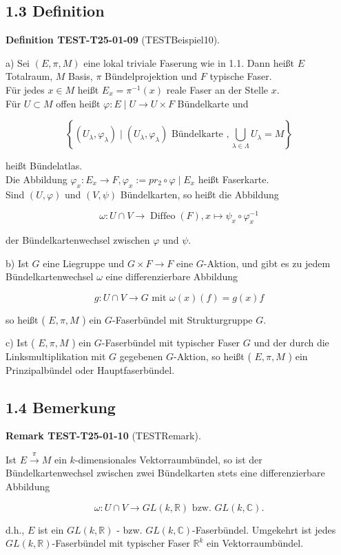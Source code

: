 \documentclass[10pt, letterpaper]{article}
\newcommand{\CustomHeading}[3]{%
  \par\medskip\noindent%
  \textbf{#1 #2} \textnormal{(#3)}.\enskip%
}
\newenvironment{DEF}[2]{\begin{unitbox}\CustomHeading{Definition}{#1}{#2}}{\end{unitbox}}
\newenvironment{REM}[2]{\begin{unitbox}\CustomHeading{Remark}{#1}{#2}}{\end{unitbox}}
\begin{document}
\subsection*{1.3 Definition}
\begin{DEF}{TEST-T25-01-09}{TESTBeispiel10}
a) Sei $(E, \pi, M)$ eine lokal triviale Faserung wie in 1.1. Dann heißt $E$ Totalraum, $M$ Basis, $\pi$ Bündelprojektion und $F$ typische Faser.\\
Für jedes $x \in M$ heißt $E_{x}=\pi^{-1}(x)$ reale Faser an der Stelle $x$.\\
Für $U \subset M$ offen heißt $\varphi: E \mid U \rightarrow U \times F$ Bündelkarte und

$$
\left\{\left(U_{\lambda}, \varphi_{\lambda}\right) \mid\left(U_{\lambda}, \varphi_{\lambda}\right) \text { Bündelkarte }, \bigcup_{\lambda \in \Lambda} U_{\lambda}=M\right\}
$$

heißt Bündelatlas.\\
Die Abbildung $\varphi_{x}: E_{x} \rightarrow F, \varphi_{x}:=p r_{2} \circ \varphi \mid E_{x}$ heißt Faserkarte.\\
Sind $(U, \varphi)$ und $(V, \psi)$ Bündelkarten, so heißt die Abbildung

$$
\omega: U \cap V \rightarrow \operatorname{Diffeo}(F), x \mapsto \psi_{x} \circ \varphi_{x}^{-1}
$$

der Bündelkartenwechsel zwischen $\varphi$ und $\psi$.

b) Ist $G$ eine Liegruppe und $G \times F \rightarrow F$ eine $G$-Aktion, und gibt es zu jedem Bündelkartenwechsel $\omega$ eine differenzierbare Abbildung

$$
g: U \cap V \rightarrow G \text { mit } \omega(x)(f)=g(x) f
$$

so heißt ( $E, \pi, M$ ) ein $G$-Faserbündel mit Strukturgruppe $G$.

c) Ist ( $E, \pi, M$ ) ein $G$-Faserbündel mit typischer Faser $G$ und der durch die Linksmultiplikation mit $G$ gegebenen $G$-Aktion, so heißt ( $E, \pi, M$ ) ein Prinzipalbündel oder Hauptfaserbündel.
\end{DEF}

\subsection*{1.4 Bemerkung}
\begin{REM}{TEST-T25-01-10}{TESTRemark}
Ist $E \xrightarrow{\pi} M$ ein $k$-dimensionales Vektorraumbündel, so ist der Bündelkartenwechsel zwischen zwei Bündelkarten stets eine differenzierbare Abbildung

$$
\omega: U \cap V \rightarrow G L(k, \mathbb{R}) \text { bzw. } G L(k, \mathbb{C}) .
$$

d.h., $E$ ist ein $G L(k, \mathbb{R})$ - bzw. $G L(k, \mathbb{C})$-Faserbündel. Umgekehrt ist jedes $G L(k, \mathbb{R})$-Faserbündel mit typischer Faser $\mathbb{R}^{k}$ ein Vektorraumbündel.
\end{REM}
\end{document}
